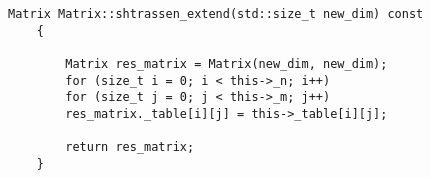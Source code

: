 \begin{appendices}
	\begin{lstlisting}[label=lst:stras_meth,caption= Метод расширения матрицы до квадартной матрицы с заданной размерностью]
	Matrix Matrix::shtrassen_extend(std::size_t new_dim) const
	{
		
		Matrix res_matrix = Matrix(new_dim, new_dim);
		for (size_t i = 0; i < this->_n; i++)
		for (size_t j = 0; j < this->_m; j++)
		res_matrix._table[i][j] = this->_table[i][j];
		
		return res_matrix;
	}
	\end{lstlisting}
	
	
\end{appendices}